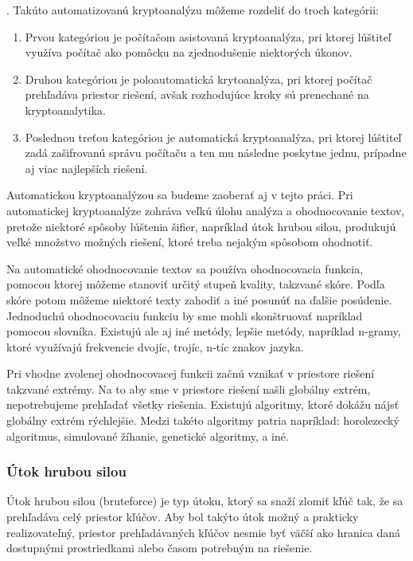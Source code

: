  \cite{ks}.
Takúto automatizovanú kryptoanalýzu môžeme rozdeliť do troch kategórii:
\begin{enumerate}
\item
Prvou kategóriou je počítačom asistovaná kryptoanalýza, pri ktorej lúštiteľ využíva
počítač ako pomôcku na zjednodušenie niektorých úkonov.
\item
Druhou kategóriou je poloautomatická krytoanalýza, pri ktorej počítač prehľadáva priestor riešení, avšak
rozhodujúce kroky sú prenechané na kryptoanalytika.
\item
Poslednou treťou kategóriou je automatická kryptoanalýza, pri ktorej lúštiteľ zadá zašifrovanú správu počítaču a ten mu následne poskytne jednu, prípadne aj
viac najlepších riešení.
\end{enumerate}
Automatickou kryptoanalýzou sa budeme zaoberať aj v tejto práci.
Pri automatickej kryptoanalýze zohráva veľkú úlohu analýza a ohodnocovanie textov, pretože niektoré spôsoby lúštenia šifier,
napríklad útok hrubou silou, produkujú veľké množstvo možných riešení, ktoré treba nejakým spôsobom ohodnotiť.

Na automatické ohodnocovanie textov sa používa ohodnocovacia funkcia, pomocou ktorej môžeme stanoviť určitý stupeň kvality, takzvané skóre.
Podľa skóre potom môžeme niektoré texty zahodiť a iné posunúť na ďalšie posúdenie.
Jednoduchú ohodnocovaciu funkciu by sme mohli skonštruovať napríklad pomocou slovníka.
Existujú ale aj iné metódy, lepšie metódy, napríklad n-gramy, ktoré využívajú frekvencie dvojíc, trojíc, n-tíc znakov jazyka.

Pri vhodne zvolenej ohodnocovacej funkcii začnú vznikať v priestore riešení takzvané extrémy. Na to aby sme v priestore riešení našli globálny extrém,
nepotrebujeme prehľadať všetky riešenia. Existujú algoritmy, ktoré dokážu nájsť globálny extrém rýchlejšie.
Medzi takéto algoritmy patria napríklad: horolezecký algoritmus, simulované žíhanie, genetické algoritmy, a iné.

\subsubsection{Útok hrubou silou}
Útok hrubou silou (bruteforce) je typ útoku, ktorý sa snaží zlomiť kľúč tak, že sa prehľadáva celý priestor kľúčov.
Aby bol takýto útok možný a prakticky realizovateľný, priestor prehľadávaných kľúčov nesmie byť väčší ako hranica daná dostupnými
prostriedkami alebo časom potrebným na riešenie.

